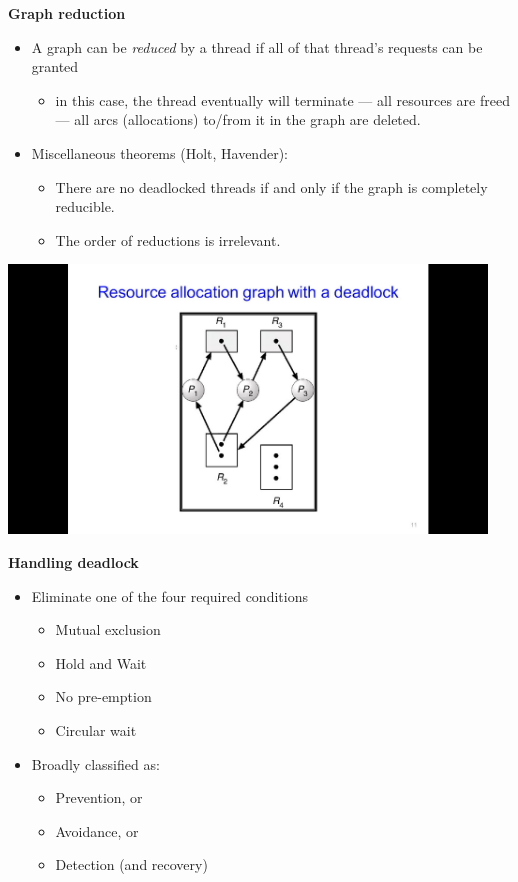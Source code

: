 \documentclass[11pt,a4paper]{article}
\begin{document}
\textbf{Graph reduction}
\begin{itemize}
    \item A graph can be \emph{reduced} by a thread if all of that thread's requests
        can be granted
        \begin{itemize}
            \item in this case, the thread eventually will terminate --- all resources are
                freed --- all arcs (allocations) to/from it in the graph are deleted.
        \end{itemize}
    \item Miscellaneous theorems (Holt, Havender):
        \begin{itemize}
            \item There are no deadlocked threads if and only if the graph is completely
                reducible.
            \item The order of reductions is irrelevant.
        \end{itemize}
\end{itemize}

\includegraphics[height=270]{resource-allocation-graph-with-a-deadlock.jpg}

\textbf{Handling deadlock}
\begin{itemize}
    \item Eliminate one of the four required conditions
        \begin{itemize}
            \item Mutual exclusion
            \item Hold and Wait
            \item No pre-emption
            \item Circular wait
        \end{itemize}
    \item Broadly classified as:
        \begin{itemize}
            \item Prevention, or
            \item Avoidance, or
            \item Detection (and recovery)
        \end{itemize}
\end{itemize}
\end{document}
